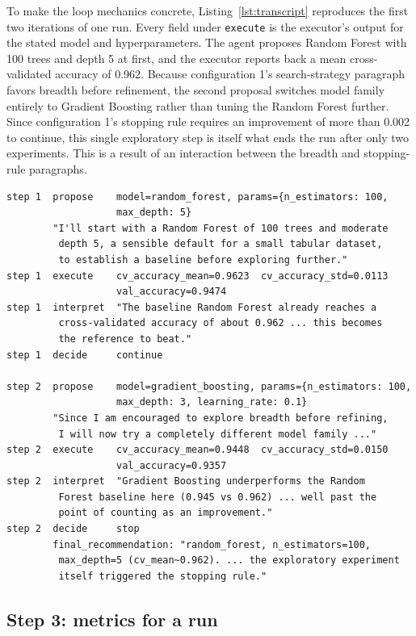 \documentclass[11pt]{article}
\begin{document}
To make the loop mechanics concrete, Listing~\ref{lst:transcript} reproduces the first two iterations of one run. Every field under \texttt{execute} is the executor's output for the stated model and hyperparameters. The agent proposes Random Forest with 100 trees and depth 5 at first, and the executor reports back a mean cross-validated accuracy of 0.962. Because configuration 1's search-strategy paragraph favors breadth before refinement, the second proposal switches model family entirely to Gradient Boosting rather than tuning the Random Forest further. Since configuration 1's stopping rule requires an improvement of more than 0.002 to continue, this single exploratory step is itself what ends the run after only two experiments. This is a result of an interaction between the breadth and stopping-rule paragraphs.

\begin{lstlisting}[caption={First two iterations of a real run under configuration 1.},label={lst:transcript}]
step 1  propose    model=random_forest, params={n_estimators: 100,
                   max_depth: 5}
        "I'll start with a Random Forest of 100 trees and moderate
         depth 5, a sensible default for a small tabular dataset,
         to establish a baseline before exploring further."
step 1  execute    cv_accuracy_mean=0.9623  cv_accuracy_std=0.0113
                   val_accuracy=0.9474
step 1  interpret  "The baseline Random Forest already reaches a
         cross-validated accuracy of about 0.962 ... this becomes
         the reference to beat."
step 1  decide     continue

step 2  propose    model=gradient_boosting, params={n_estimators: 100,
                   max_depth: 3, learning_rate: 0.1}
        "Since I am encouraged to explore breadth before refining,
         I will now try a completely different model family ..."
step 2  execute    cv_accuracy_mean=0.9448  cv_accuracy_std=0.0150
                   val_accuracy=0.9357
step 2  interpret  "Gradient Boosting underperforms the Random
         Forest baseline here (0.945 vs 0.962) ... well past the
         point of counting as an improvement."
step 2  decide     stop
        final_recommendation: "random_forest, n_estimators=100,
         max_depth=5 (cv_mean~0.962). ... the exploratory experiment
         itself triggered the stopping rule."
\end{lstlisting}

\subsection{Step 3: metrics for a run}
\label{sec:encoding}
\end{document}
